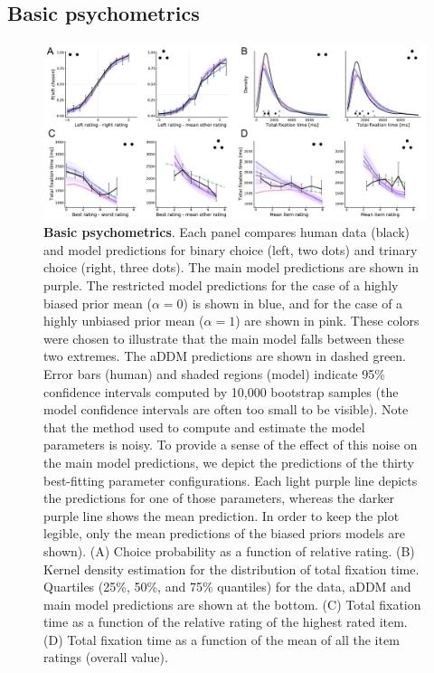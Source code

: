 \subsection{Basic psychometrics}


\begin{figure}[t!]
  \centering
  \includegraphics[width=\textwidth]{figs/attention/Fig3.pdf}
  \caption{\textbf{Basic psychometrics}.
  Each panel compares human data (black) and model predictions for binary choice (left, two dots) and trinary choice (right, three dots). The main model predictions are shown in purple. The restricted model predictions for the case of a highly biased prior mean ($\alpha = 0$) is shown in blue, and for the case of a highly unbiased prior mean ($\alpha = 1$) are shown in pink. These colors were chosen to illustrate that the main model falls between these two extremes. The aDDM predictions are shown in dashed green. Error bars (human) and shaded regions (model) indicate 95\% confidence intervals computed by 10,000 bootstrap samples (the model confidence intervals are often too small to be visible). Note that the method used to compute and estimate the model parameters is noisy. To provide a sense of the effect of this noise on the main model predictions, we depict the predictions of the thirty best-fitting parameter configurations. Each light purple line depicts the predictions for one of those parameters, whereas the darker purple line shows the mean prediction. In order to keep the plot legible, only the mean predictions of the biased priors models are shown). 
  (A) Choice probability as a function of relative rating.
  (B) Kernel density estimation for the distribution of total fixation time. Quartiles (25\%, 50\%, and 75\% quantiles) for the data, aDDM and main model predictions are shown at the bottom.
  (C) Total fixation time as a function of the relative rating of the highest rated item.
  (D) Total fixation time as a function of the mean of all the item ratings (overall value).
  }
  \label{fig3}
\end{figure}


